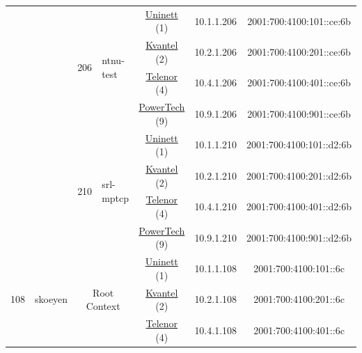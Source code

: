 \begin{small}
\begin{center}
\begin{longtable}{|c|c|c|c|c|c|c|c|}
  &  & \multirow{4}{*}{\tiny{206}} & \multicolumn{1}{|l|}{\multirow{4}{*}{\tiny{ntnu-test}}} & \multicolumn{2}{|c|}{\tiny{\href{https://www.uninett.no}{Uninett} (1)}} & \tiny{10.1.1.206} & \tiny{2001:700:4100:101::ce:6b} \\* \cline{5-5}\cline{6-6}\cline{7-7}\cline{8-8}
  &  &  &  & \multicolumn{2}{|c|}{\tiny{\href{http://kvantel.no}{Kvantel} (2)}} & \tiny{10.2.1.206} & \tiny{2001:700:4100:201::ce:6b} \\* \cline{5-5}\cline{6-6}\cline{7-7}\cline{8-8}
  &  &  &  & \multicolumn{2}{|c|}{\tiny{\href{https://www.telenor.no}{Telenor} (4)}} & \tiny{10.4.1.206} & \tiny{2001:700:4100:401::ce:6b} \\* \cline{5-5}\cline{6-6}\cline{7-7}\cline{8-8}
  &  &  &  & \multicolumn{2}{|c|}{\tiny{\href{http://www.powertech.no}{PowerTech} (9)}} & \tiny{10.9.1.206} & \tiny{2001:700:4100:901::ce:6b} \\* \cline{3-3}\cline{4-4}\cline{5-5}\cline{6-6}\cline{7-7}\cline{8-8}
  &  & \multirow{4}{*}{\tiny{210}} & \multicolumn{1}{|l|}{\multirow{4}{*}{\tiny{srl-mptcp}}} & \multicolumn{2}{|c|}{\tiny{\href{https://www.uninett.no}{Uninett} (1)}} & \tiny{10.1.1.210} & \tiny{2001:700:4100:101::d2:6b} \\* \cline{5-5}\cline{6-6}\cline{7-7}\cline{8-8}
  &  &  &  & \multicolumn{2}{|c|}{\tiny{\href{http://kvantel.no}{Kvantel} (2)}} & \tiny{10.2.1.210} & \tiny{2001:700:4100:201::d2:6b} \\* \cline{5-5}\cline{6-6}\cline{7-7}\cline{8-8}
  &  &  &  & \multicolumn{2}{|c|}{\tiny{\href{https://www.telenor.no}{Telenor} (4)}} & \tiny{10.4.1.210} & \tiny{2001:700:4100:401::d2:6b} \\* \cline{5-5}\cline{6-6}\cline{7-7}\cline{8-8}
  &  &  &  & \multicolumn{2}{|c|}{\tiny{\href{http://www.powertech.no}{PowerTech} (9)}} & \tiny{10.9.1.210} & \tiny{2001:700:4100:901::d2:6b} \\ \hline
 \multirow{16}{*}{\tiny{108}} & \multicolumn{1}{|l|}{\multirow{16}{*}{\tiny{skoeyen}}} & \multicolumn{2}{|c|}{\multirow{4}{*}{\tiny{Root Context}}} & \multicolumn{2}{|c|}{\tiny{\href{https://www.uninett.no}{Uninett} (1)}} & \tiny{10.1.1.108} & \tiny{2001:700:4100:101::6c} \\* \cline{5-5}\cline{6-6}\cline{7-7}\cline{8-8}
  &  & \multicolumn{2}{|c|}{} & \multicolumn{2}{|c|}{\tiny{\href{http://kvantel.no}{Kvantel} (2)}} & \tiny{10.2.1.108} & \tiny{2001:700:4100:201::6c} \\* \cline{5-5}\cline{6-6}\cline{7-7}\cline{8-8}
  &  & \multicolumn{2}{|c|}{} & \multicolumn{2}{|c|}{\tiny{\href{https://www.telenor.no}{Telenor} (4)}} & \tiny{10.4.1.108} & \tiny{2001:700:4100:401::6c} \\* \cline{5-5}\cline{6-6}\cline{7-7}\cline{8-8}

\end{longtable}
\end{center}
\end{small}
